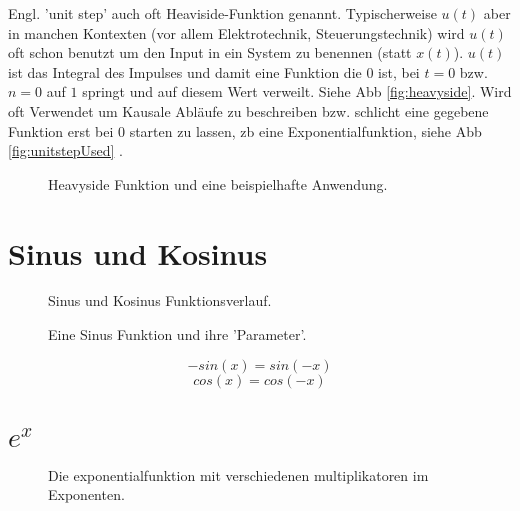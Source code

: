 Engl. 'unit step' auch oft Heaviside-Funktion genannt. Typischerweise $u(t)$ aber in manchen Kontexten (vor allem Elektrotechnik, Steuerungstechnik) wird $u(t)$ oft schon benutzt um den Input in ein System zu benennen (statt $x(t)$). $u(t)$ ist das Integral des Impulses und damit eine Funktion die $0$ ist, bei $t=0$ bzw. $n=0$ auf $1$ springt und auf diesem Wert verweilt. Siehe Abb \ref{fig:heavyside}. Wird oft Verwendet um Kausale Abläufe zu beschreiben bzw. schlicht eine gegebene Funktion erst bei 0 starten zu lassen, zb eine Exponentialfunktion, siehe Abb \ref{fig:unitstepUsed} .



\begin{figure}[H]
    \centering
    \subfigure[Einheitsschrittfunktion]{
        
        \label{fig:heavyside}
    }
    \hfill
    \caption{Heavyside Funktion und eine beispielhafte Anwendung.}
    \label{fig:unitStepComparison}
\end{figure}

\section{Sinus und Kosinus}

\begin{figure}[H]
	\centering
	
	\caption{Sinus und Kosinus Funktionsverlauf.}
	\label{fig:sincos}
\end{figure}



\begin{figure}[H]
	\centering
	
	\caption{Eine Sinus Funktion und ihre 'Parameter'.}
	\label{fig:sinParams}
\end{figure}


\begin{equation}
-sin(x) = sin(-x)
\end{equation}
\begin{equation}
cos(x) = cos(-x)
\end{equation}

\section{$e^x$}

\begin{figure}[H]
	\centering
	
	\caption{Die exponentialfunktion mit verschiedenen multiplikatoren im Exponenten.}
	\label{fig:expVersions}
\end{figure}

